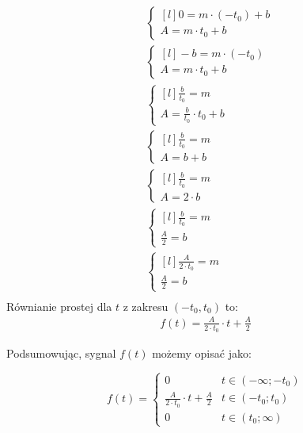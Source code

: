 \begin{task}
\begin{align*}
&\left\{\begin{matrix*}[l]
0 = m\cdot (-t_{0}) +b\\ 
A = m\cdot t_0 +b
\end{matrix*}\right. \\
&\left\{\begin{matrix*}[l]
-b = m\cdot (-t_{0})\\ 
A = m\cdot t_0 +b
\end{matrix*}\right. \\
&\left\{\begin{matrix*}[l]
\frac{b}{t_{0}} = m\\ 
A = \frac{b}{t_{0}} \cdot t_0 +b
\end{matrix*}\right. \\
&\left\{\begin{matrix*}[l]
\frac{b}{t_{0}} = m\\ 
A =b +b
\end{matrix*}\right. \\
&\left\{\begin{matrix*}[l]
\frac{b}{t_{0}} = m\\ 
A =2\cdot b
\end{matrix*}\right.\\
&\left\{\begin{matrix*}[l]
\frac{b}{t_{0}} = m\\ 
\frac{A}{2} = b
\end{matrix*}\right.\\
&\left\{\begin{matrix*}[l]
\frac{A}{2\cdot t_{0}} = m\\ 
\frac{A}{2} = b
\end{matrix*}\right.\\
\end{align*}
Równianie prostej dla $t$ z zakresu  $(-t_{0},t_0)$ to:
\begin{align*}
f(t) = \frac{A}{2\cdot t_{0}}\cdot t + \frac{A}{2}
\end{align*}

Podsumowując, sygnal $f(t)$ możemy opisać jako:

\begin{equation}
f(t)=\begin{cases}
0 & t \in \left( -\infty; -t_0 \right ) \\
\frac{A}{2\cdot t_{0}}\cdot t + \frac{A}{2} & t \in \left( -t_0; t_0 \right ) \\
0 & t \in \left( t_0; \infty \right )
\end{cases} 
\end{equation}


\end{task}
